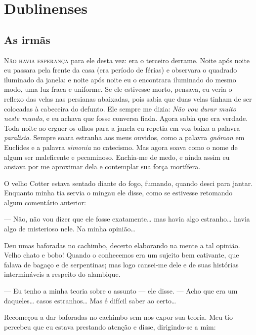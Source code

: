 
\part{Dublinenses}


\chapter{As irmãs}

\openany

\textsc{Não havia esperança} para ele desta vez: era o terceiro derrame.  Noite
após noite eu passara pela frente da casa (era período de férias) e observara o
quadrado iluminado da janela: e noite após noite eu o encontrara iluminado do
mesmo modo, uma luz fraca e uniforme.  Se ele estivesse morto, pensava, eu
veria o reflexo das velas nas persianas abaixadas, pois sabia que duas velas
tinham de ser colocadas à cabeceira do defunto.  Ele sempre me dizia:
\textit{Não vou durar muito neste mundo}, e eu achava que fosse conversa fiada.
Agora sabia que era verdade.  Toda noite ao erguer os olhos para a janela eu
repetia em voz baixa a palavra \textit{paralisia}.  Sempre soara estranha aos
meus ouvidos, como a palavra \textit{gnômon} em Euclides e a palavra
\textit{simonia} no catecismo.  Mas agora soava como o nome de algum ser
maleficente e pecaminoso.  Enchia-me de medo, e ainda assim eu ansiava por me
aproximar dela e contemplar sua força mortífera.

O velho Cotter estava sentado diante do fogo, fumando, quando desci para
jantar.  Enquanto minha tia servia o mingau ele disse, como se estivesse
retomando algum comentário anterior:

--- Não, não vou dizer que ele fosse exatamente\ldots{} mas havia algo
estranho\ldots{} havia algo de misterioso nele.  Na minha opinião\ldots{}

Deu umas baforadas no cachimbo, decerto elaborando na mente a tal opinião.
Velho chato e bobo! Quando o conhecemos era um sujeito bem cativante, que
falava de bagaço e de serpentinas; mas logo cansei-me dele e de suas histórias
intermináveis a respeito do alambique.

--- Eu tenho a minha teoria sobre o assunto --- ele disse.  --- Acho que era um
daqueles\ldots{} casos estranhos\ldots{} Mas é difícil saber ao certo\ldots{}

Recomeçou a dar baforadas no cachimbo sem nos expor sua teoria.  Meu tio
percebeu que eu estava prestando atenção e disse, dirigindo-se a mim:

